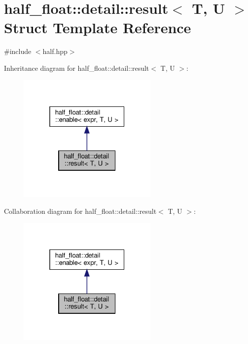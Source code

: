 \hypertarget{structhalf__float_1_1detail_1_1result}{}\section{half\+\_\+float\+:\+:detail\+:\+:result$<$ T, U $>$ Struct Template Reference}
\label{structhalf__float_1_1detail_1_1result}


{\ttfamily \#include $<$half.\+hpp$>$}



Inheritance diagram for half\+\_\+float\+:\+:detail\+:\+:result$<$ T, U $>$\+:
\nopagebreak
\begin{figure}[H]
\begin{center}
\leavevmode
\includegraphics[width=193pt]{structhalf__float_1_1detail_1_1result__inherit__graph}
\end{center}
\end{figure}


Collaboration diagram for half\+\_\+float\+:\+:detail\+:\+:result$<$ T, U $>$\+:
\nopagebreak
\begin{figure}[H]
\begin{center}
\leavevmode
\includegraphics[width=193pt]{structhalf__float_1_1detail_1_1result__coll__graph}
\end{center}
\end{figure}


